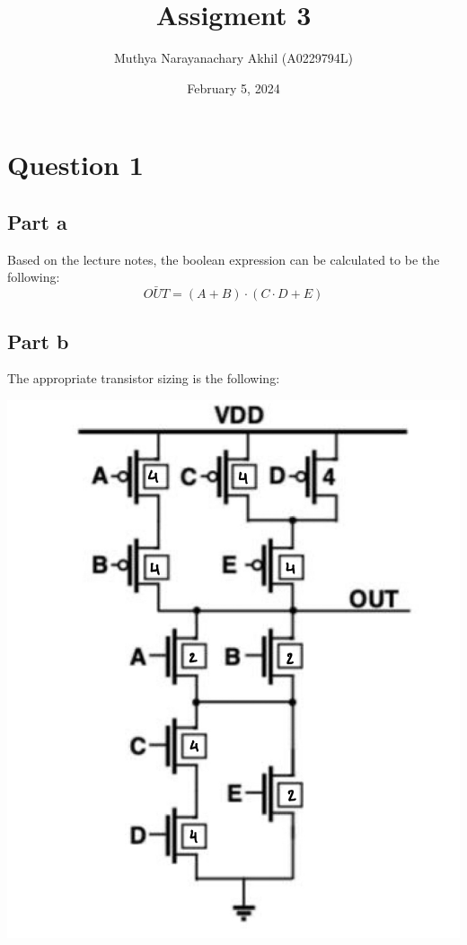 \documentclass{article}
\title{Assigment 3}
\author{Muthya Narayanachary Akhil (A0229794L)}
\date{February 5, 2024}
\begin{document}
\maketitle

\section*{Question 1}
\subsection*{Part a}

Based on the lecture notes, the boolean expression can be calculated to be the following:
\begin{equation}
    \bar{OUT} = (A + B) \cdot (C \cdot D + E)
\end{equation}

\subsection*{Part b}
The appropriate transistor sizing is the following:

\includegraphics[scale = 0.5]{transistorsizing.png}
\end{document}
